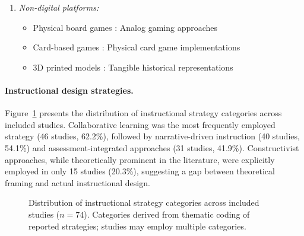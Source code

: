 \documentclass[a4paper,fleqn]{cas-sc}
\begin{document}
\begin{enumerate}[noitemsep]
	\item 
\textit{Non-digital platforms:}
\begin{itemize}[noitemsep]
 \item Physical board games \citep{29Stiso20201165, 42Huffer201581, 43ali2018indonesian, 50Lye2013, 53Perez2014, 60Hoy2018, 62Milosz201896, 67Lin201296, 70Hou201519, 73Wolfartsberger2011160, 75trajano2014using, 78Rouse2022357}: Analog gaming approaches
 \item Card-based games \citep{13Humpire2022, 43ali2018indonesian, 47Clara2010156, 50Lye2013, 58Shih2015173}: Physical card game implementations
 \item 3D printed models \citep{73Wolfartsberger2011160}: Tangible historical representations
\end{itemize}
\end{enumerate}


\paragraph{Instructional design strategies.}

Figure~\ref{fig:instructional_strategies} presents the distribution of instructional strategy categories across included studies. Collaborative learning was the most frequently employed strategy (46 studies, 62.2\%), followed by narrative-driven instruction (40 studies, 54.1\%) and assessment-integrated approaches (31 studies, 41.9\%). Constructivist approaches, while theoretically prominent in the literature, were explicitly employed in only 15 studies (20.3\%), suggesting a gap between theoretical framing and actual instructional design.

\begin{figure}[ht!]
\centering
{}
\caption{Distribution of instructional strategy categories across included studies ($n=74$). Categories derived from thematic coding of reported strategies; studies may employ multiple categories.}
\label{fig:instructional_strategies}
\end{figure}
\end{document}

